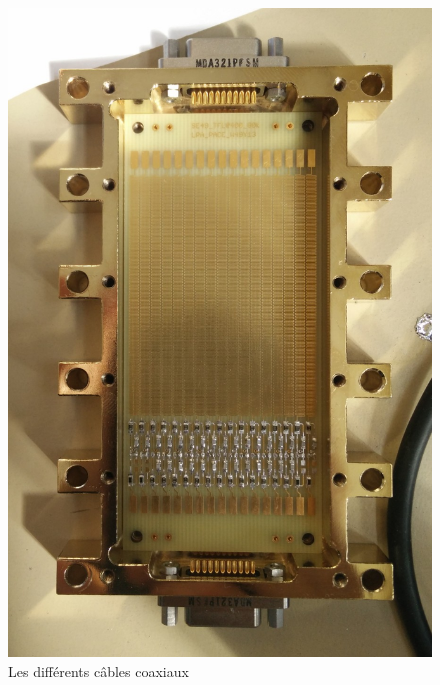 \documentclass[8pt,a9paper]{beamer} \usepackage[utf8]{inputenc} \usepackage[francais]{babel} \usepackage[T1]{fontenc}
\begin{document}
\begin{frame}
\begin{columns}
\begin{column}{0.3\textwidth}
\begin{figure}[h]
\begin{center}
        \includegraphics[width=\textwidth]{Images/Thermalisation/DC3_non_rotate}
        \caption{Les différents câbles coaxiaux}
    \end{center}
\end{figure}
\end{column}
\end{columns}
\end{frame}
\end{document}

